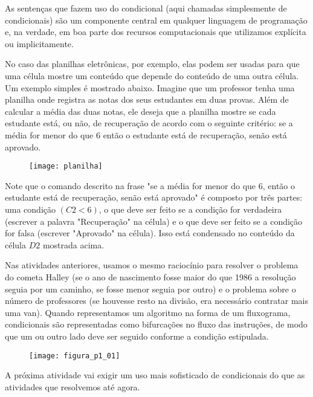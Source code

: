 
As sentenças que fazem uso do condicional (aqui chamadas simplesmente de condicionais) são um componente central em qualquer linguagem de programação e, na verdade, em boa parte dos recursos computacionais que utilizamos explícita ou implicitamente.

No caso das planilhas eletrônicas, por exemplo, elas podem ser usadas para que uma célula mostre um conteúdo que depende do conteúdo de uma outra célula. Um exemplo simples é mostrado abaixo. Imagine que um professor tenha uma planilha onde registra as notas dos seus estudantes em duas provas. Além de calcular a média das duas notas, ele deseja que a planilha mostre se cada estudante está, ou não, de recuperação de acordo com o seguinte critério: se a média for menor do que $6$ então o estudante está de recuperação, senão está aprovado.

\begin{figure}[H]
\centering

\texttt{[image: planilha]}
\end{figure}

Note que o comando descrito na frase "se a média for menor do que 6, então o estudante está de recuperação, senão está aprovado"{} é composto por três partes: uma condição $(C2<6)$, o que deve ser feito se a condição for verdadeira (escrever a palavra "Recuperação"{} na célula) e o que deve ser feito se a condição for falsa (escrever "Aprovado"{} na célula). Isso está condensado no conteúdo da célula $D2$ mostrada acima.

Nas atividades anteriores, usamos o mesmo raciocínio para resolver o problema do cometa Halley (se o ano de nascimento fosse maior do que 1986 a resolução seguia por um caminho, se fosse menor seguia por outro) e o problema sobre o número de professores (se houvesse resto na divisão, era necessário contratar mais uma van). Quando representamos um algoritmo na forma de um fluxograma, condicionais são representadas como bifurcações no fluxo das instruções, de modo que um ou outro lado deve ser seguido conforme a condição estipulada.

\begin{figure}[H]
\centering

\texttt{[image: figura\_p1\_01]}
\end{figure}

A próxima atividade vai exigir um uso mais sofisticado de condicionais do que as atividades que resolvemos até agora.

